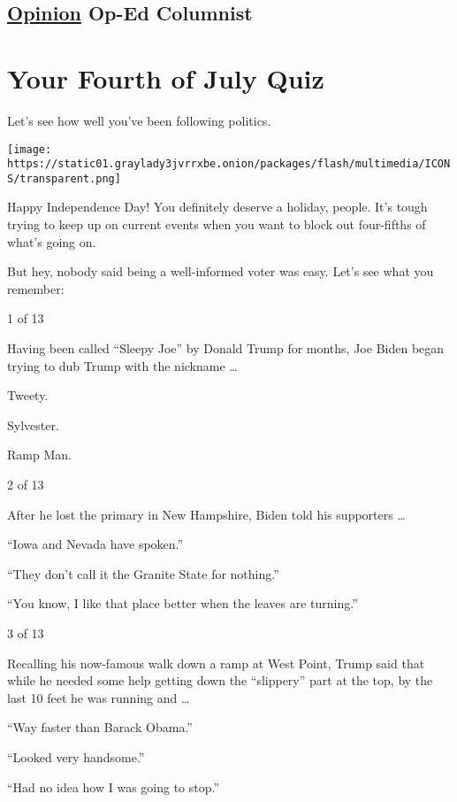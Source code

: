 \hypertarget{-opinion--op-ed-columnist}{%
\subsection{\texorpdfstring{ \href{/section/opinion}{Opinion}
\textbar{}Op-Ed
Columnist}{ Opinion  \textbar Op-Ed Columnist}}\label{-opinion--op-ed-columnist}}

\hypertarget{your-fourth-of-july-quiz}{%
\section{Your Fourth of July Quiz}\label{your-fourth-of-july-quiz}}

Let's see how well you've been following politics.

\texttt{[image: https://static01.graylady3jvrrxbe.onion/packages/flash/multimedia/ICONS/transparent.png]}

Happy Independence Day! You definitely deserve a holiday, people. It's
tough trying to keep up on current events when you want to block out
four-fifths of what's going on.

But hey, nobody said being a well-informed voter was easy. Let's see
what you remember:

1 of 13

Having been called ``Sleepy Joe'' by Donald Trump for months, Joe Biden
began trying to dub Trump with the nickname \ldots{}

Tweety.

Sylvester.

Ramp Man.

2 of 13

After he lost the primary in New Hampshire, Biden told his supporters
\ldots{}

``Iowa and Nevada have spoken.''

``They don't call it the Granite State for nothing.''

``You know, I like that place better when the leaves are turning.''

3 of 13

Recalling his now-famous walk down a ramp at West Point, Trump said that
while he needed some help getting down the ``slippery'' part at the top,
by the last 10 feet he was running and \ldots{}

``Way faster than Barack Obama.''

``Looked very handsome.''

``Had no idea how I was going to stop.''

